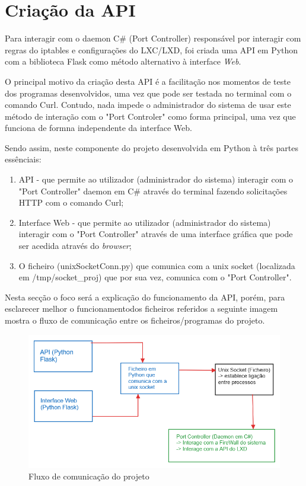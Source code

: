 \section{Criação da API}

Para interagir com o daemon C\# (Port Controller) responsável por interagir com regras do iptables
e configurações do LXC/LXD, foi criada uma API em Python com a biblioteca Flask como
método alternativo à interface \textit{Web}.

O principal motivo da criação desta API é a facilitação nos momentos de teste dos programas
desenvolvidos, uma vez que pode ser testada no terminal com o comando Curl. Contudo, nada 
impede o administrador do sistema de usar este método de interação com o "Port Controler"
como forma principal, uma vez que funciona de formna independente da interface Web.

Sendo assim, neste componente do projeto desenvolvida em Python à três partes essênciais:

\begin{enumerate}
    \item API - que permite ao utilizador (administrador do sistema) interagir com o "Port Controller" daemon em C\#
    através do terminal fazendo solicitações HTTP com o comando Curl;
    \item Interface Web - que permite ao utilizador (administrador do sistema) interagir com o "Port Controller"
    através de uma interface gráfica que pode ser acedida através do \textit{browser};
    \item O ficheiro (unixSocketConn.py) que comunica com a unix socket (localizada em /tmp/socket\_proj) que por sua vez, comunica com o "Port Controller". 
\end{enumerate}

Nesta secção o foco será a explicação do funcionamento da API, porém, para esclarecer
melhor o funcionamentodos ficheiros referidos a seguinte imagem
mostra o fluxo de comunicação entre os ficheiros/programas do projeto.

\begin{figure}[H]
\begin{center}
\includegraphics[width=14cm]{figs/fluxo de comunicação.png}
\caption{Fluxo de comunicação do projeto}
\label{fig:bookstack}
\end{center}
\end{figure}



